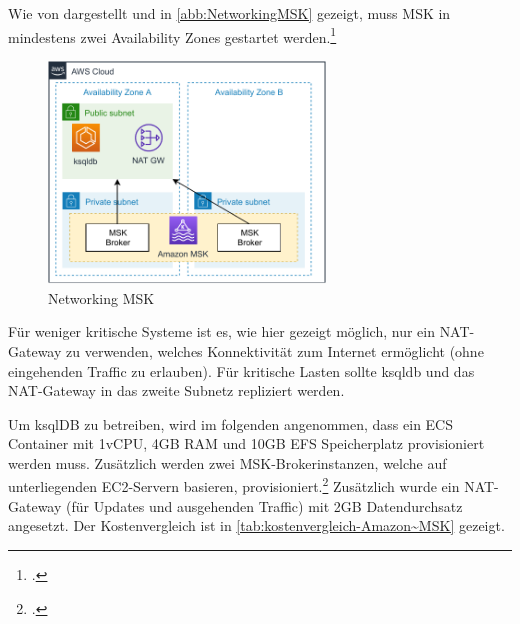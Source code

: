 Wie von \citeauthor{Beswick.2020} dargestellt und in \autoref{abb:NetworkingMSK} gezeigt, muss MSK in mindestens zwei Availability Zones gestartet werden.\footcite[Vgl. auch im Folgenden][]{Beswick.2020} 
\begin{figure}[H]
\centering
\includegraphics[width=0.655\textwidth]{graphics/MSK-Networking.pdf}
\caption{Networking MSK}
\label{abb:NetworkingMSK}
\end{figure}
Für weniger kritische Systeme ist es, wie hier gezeigt möglich, nur ein \ac{NAT}-Gateway zu verwenden, welches Konnektivität zum Internet ermöglicht (ohne eingehenden Traffic zu erlauben). Für kritische Lasten sollte ksqldb und das \ac{NAT}-Gateway in das zweite Subnetz repliziert werden.

Um ksqlDB zu betreiben, wird im folgenden angenommen, dass ein \acf{ECS} Container mit 1vCPU, 4GB \ac{RAM} und 10GB \ac{EFS} Speicherplatz provisioniert werden muss. Zusätzlich werden zwei \ac{MSK}-Brokerinstanzen, welche auf unterliegenden \ac{EC2}-Servern basieren, provisioniert.\footcite[Vgl.][]{AmazonWebServicesInc..o.J.o} Zusätzlich wurde ein \ac{NAT}-Gateway (für Updates und ausgehenden Traffic) mit 2GB Datendurchsatz angesetzt. Der Kostenvergleich ist in \autoref{tab:kostenvergleich-Amazon~MSK} gezeigt.

